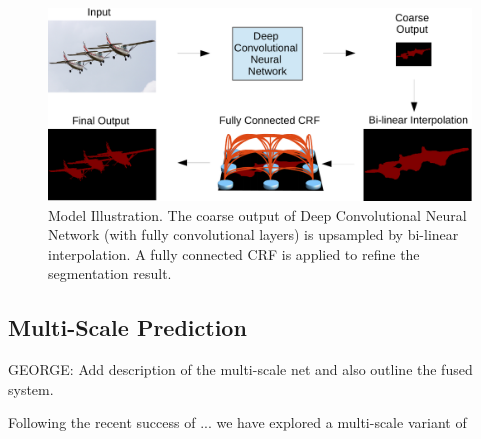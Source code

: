 \begin{figure}
  \centering
  \includegraphics[width=1\linewidth]{fig/model_illustration2.pdf}
  \caption{Model Illustration. The coarse output of Deep Convolutional Neural
    Network (with fully convolutional layers) is upsampled by bi-linear
    interpolation. A fully connected CRF is applied to refine the segmentation
    result.}
  \label{fig:ModelIllustration}
\end{figure}

\subsection{Multi-Scale Prediction}
\label{sec:multiscale}

GEORGE: Add description of the multi-scale net and also outline
  the fused system.

Following the recent success of ... we have explored a multi-scale variant of 
